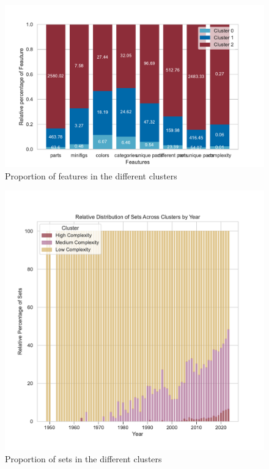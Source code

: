\documentclass{article}
\theoremstyle{plain}
\theoremstyle{definition}
\theoremstyle{remark}
\begin{document}
\begin{figure}[ht]
 \vskip 0.2in
 \begin{center}
 \centerline{\includegraphics[width=\columnwidth]{../Images/Clusters_features.pdf}}
\caption{Proportion of features in the different clusters}
\label{icml-historical}
 \end{center}
 \vskip -0.2in
\end{figure}

\begin{figure}[ht]
 \vskip 0.2in
 \begin{center}
 \centerline{\includegraphics[width=\columnwidth]{../Images/Clusters.pdf}}
\caption{Proportion of sets in the different clusters}
\label{icml-historical}
 \end{center}
 \vskip -0.2in
\end{figure}
\end{document}
